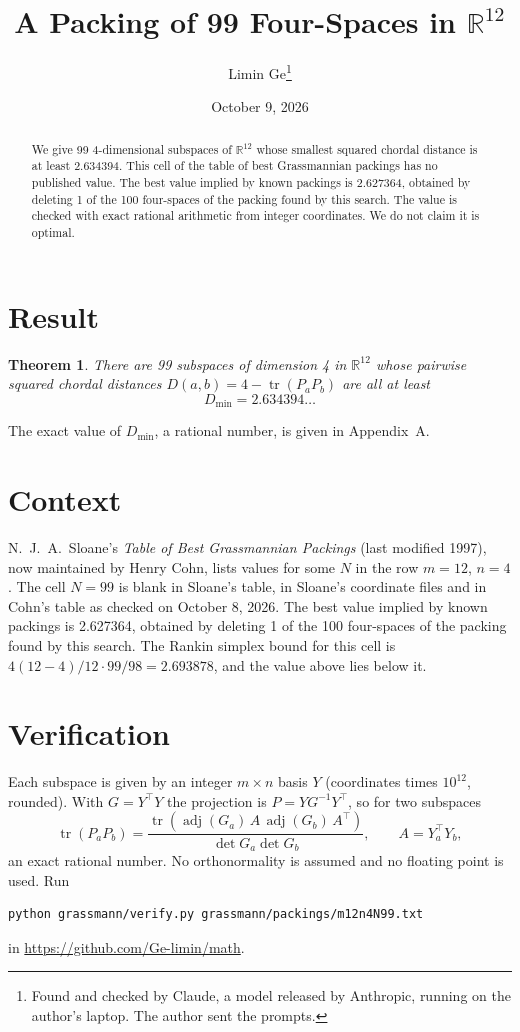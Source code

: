 \documentclass[11pt,a4paper]{article}
\title{A Packing of 99 Four-Spaces in $\mathbb{R}^{12}$}
\author{Limin Ge\thanks{Found and checked by Claude, a model released by Anthropic, running on the author's laptop. The author sent the prompts.}}
\date{October 9, 2026}
\newtheorem*{theorem}{Theorem}
\begin{document}
\maketitle
\begin{abstract}
We give 99 4-dimensional subspaces of $\mathbb{R}^{12}$ whose smallest squared chordal distance is at least 2.634394. This cell of the table of best Grassmannian packings has no published value. The best value implied by known packings is 2.627364, obtained by deleting 1 of the 100 four-spaces of the packing found by this search. The value is checked with exact rational arithmetic from integer coordinates. We do not claim it is optimal.
\end{abstract}

\section{Result}
\begin{theorem}
There are 99 subspaces of dimension 4 in $\mathbb{R}^{12}$ whose pairwise squared chordal distances $D(a,b) = 4 - \operatorname{tr}(P_aP_b)$ are all at least
\[ D_{\min} = 2.634394\ldots \]
\end{theorem}
The exact value of $D_{\min}$, a rational number, is given in Appendix~A.


\section{Context}
N.~J.~A.~Sloane's \emph{Table of Best Grassmannian Packings} (last modified 1997), now maintained by Henry Cohn, lists values for some $N$ in the row $m=12$, $n=4$. The cell $N=99$ is blank in Sloane's table, in Sloane's coordinate files and in Cohn's table as checked on October 8, 2026. The best value implied by known packings is 2.627364, obtained by deleting 1 of the 100 four-spaces of the packing found by this search. The Rankin simplex bound for this cell is $4(12-4)/12\cdot 99/98 = 2.693878$, and the value above lies below it.


\section{Verification}
Each subspace is given by an integer $m\times n$ basis $Y$ (coordinates times $10^{12}$, rounded). With $G=Y^\top Y$ the projection is $P=YG^{-1}Y^\top$, so for two subspaces
\[ \operatorname{tr}(P_aP_b)=\frac{\operatorname{tr}(\operatorname{adj}(G_a)\,A\,\operatorname{adj}(G_b)\,A^\top)}{\det G_a\det G_b},\qquad A=Y_a^\top Y_b, \]
an exact rational number. No orthonormality is assumed and no floating point is used. Run
\begin{verbatim}
python grassmann/verify.py grassmann/packings/m12n4N99.txt
\end{verbatim}
in \url{https://github.com/Ge-limin/math}.
\end{document}
